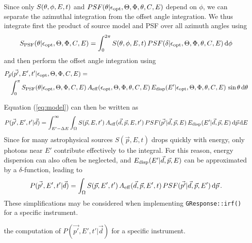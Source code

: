 \documentclass{article}[12pt,a4]
\begin{document}
Since only $S(\mbox{$\theta$}, \phi, E, t)$ and $PSF(\theta | \mbox{$\epsilon_{\rm opt}$}, \mbox{$\Theta$}, \mbox{$\Phi$}, \mbox{$\theta$}, \mbox{$C$}, E)$ depend on 
$\phi$, we can separate the azimuthal integration from the offset angle integration.
We thus integrate first the product of source model and PSF over all azimuth angles using
\begin{equation}
S_{\rm PSF}(\mbox{$\theta$} | \mbox{$\epsilon_{\rm opt}$}, \mbox{$\Theta$}, \mbox{$\Phi$}, \mbox{$C$}, E) = 
\int_{0}^{2 \pi} S(\mbox{$\theta$}, \phi, E, t) \, PSF(\mbox{$\delta$} | \mbox{$\epsilon_{\rm opt}$}, \mbox{$\Theta$}, \mbox{$\Phi$}, \mbox{$\theta$}, \mbox{$C$}, E) \, {\rm d}\phi
\end{equation}
and then perform the offset angle integration using
\begin{eqnarray}
\lefteqn{P_{\vec{p}}(\vec{p'}, E', t' | \opt, \zen, \azm, \conf, E) =} & & \nonumber \\
& & \int_0^{\pi}
S_{\rm PSF}(\off | \opt, \zen, \azm, \conf, E) \,
A_{\rm eff}(\opt, \zen, \azm, \off, \conf, E) \,
E_{\rm disp}(E' | \opt, \zen, \azm, \off, \conf, E) \,
\sin \off \, {\rm d}\off
\end{eqnarray}

Equation (\ref{eq:model}) can then be written as
\begin{equation}
P(\vec{p'}, E', t' | \vec{d}) = \int_{E'-\Delta E}^{\infty} \int_{\Omega} 
  S(\vec{p}, E, t') \, 
  A_{\rm eff}(\vec{d}, \vec{p}, E, t') \,
  PSF(\vec{p'} | \vec{d}, \vec{p}, E) \,
  E_{\rm disp}(E' | \vec{d}, \vec{p}, E) \, {\rm d}\vec{p} \, {\rm d}E
\label{eq:model}
\end{equation}
Since for many astrophysical sources $S(\vec{p}, E, t)$ drops quickly with energy, only
photons near $E'$ contribute effectively to the integral.
For this reason, energy dispersion can also often be neglected, and
$E_{\rm disp}(E' | \vec{d}, \vec{p}, E)$ can be approximated by a $\delta$-function,
leading to
\begin{equation}
P(\vec{p'}, E', t' | \vec{d})  = \int_{\Omega} 
  S(\vec{p}, E', t') \,
  A_{\rm eff}(\vec{d}, \vec{p}, E', t) \,
  PSF(\vec{p'} | \vec{d}, \vec{p}, E') \, {\rm d}\vec{p} \, .
\end{equation}
These simplifications may be considered when implementing 
{\tt GResponse::irf()}
for a specific instrument.

the computation of
$P(\vec{p'}, E', t' | \vec{d})$ for a specific instrument.
\end{document}
